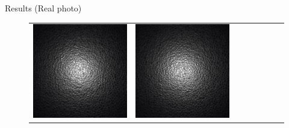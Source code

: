 \documentclass[final]{beamer}
\newlength{\twocolwid}
\newlength{\resultwidth}
\begin{document}
\begin{frame}[t]
\begin{columns}[t]
\begin{column}{\twocolwid}
\begin{block}{Results (Real photo)}
\begin{figure}[t]
\begin{tabular}{ccrclccc}
            		\includegraphics[width=\resultwidth]{real/leather/good2.jpg} &
            		\includegraphics[width=\resultwidth]{real/leather/good3.jpg} &

\end{tabular}
\end{figure}
\end{block}
\end{column}
\end{columns}
\end{frame}
\end{document}
